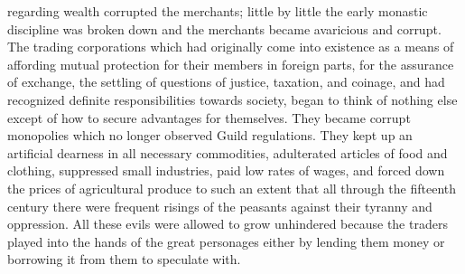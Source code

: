 \documentclass{book}
\begin{document}
regarding wealth corrupted the merchants; little by little the early monastic discipline was broken down and the merchants became avaricious and corrupt. The trading corporations which had originally come into existence as a means of affording mutual protection for their members in foreign parts, for the assurance of exchange, the settling of questions of justice, taxation, and coinage, and had recognized definite responsibilities towards society, began to think of nothing else except of how to secure advantages for themselves. They became corrupt monopolies which no longer observed Guild regulations. They kept up an artificial dearness in all necessary commodities, adulterated articles of food and clothing, suppressed small industries, paid low rates of wages, and forced down the prices of agricultural produce to such an extent that all through the fifteenth century there were frequent risings of the peasants against their tyranny and oppression. All these evils were allowed to grow unhindered because the traders played into the hands of the great personages either by lending them money or borrowing it from them to speculate with.
\end{document}
